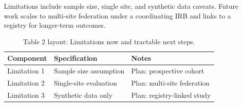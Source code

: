 
Limitations include sample size, single site, and synthetic data caveats. Future work scales to multi-site federation under a coordinating IRB and links to a registry for longer-term outcomes.

\begin{table}[H]
\caption{Table 2 layout: Limitations now and tractable next steps.}
\label{tab:limits_future}
\centering
\begin{tabular}{>{\raggedright\arraybackslash}p{3.4cm} >{\raggedright\arraybackslash}p{4.6cm} >{\raggedright\arraybackslash}p{5.4cm}}
\toprule
\textbf{Component} & \textbf{Specification} & \textbf{Notes} \\
\midrule
  Limitation 1 & Sample size assumption & Plan: prospective cohort \\
  Limitation 2 & Single-site evaluation & Plan: multi-site federation \\
  Limitation 3 & Synthetic data only & Plan: registry-linked study \\
\bottomrule
\end{tabular}
\end{table}
